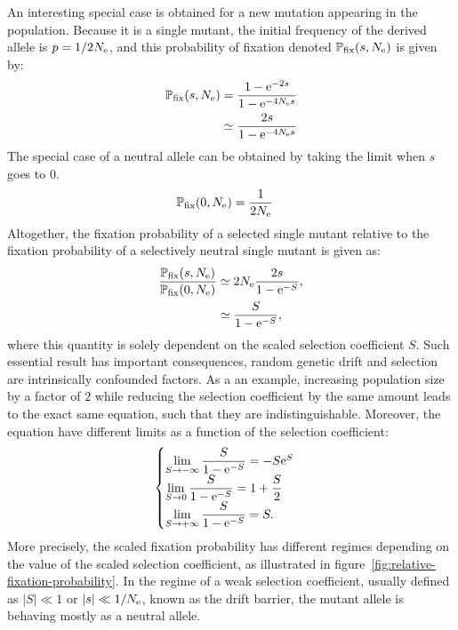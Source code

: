 An interesting special case is obtained for a new mutation appearing in the population.
Because it is a single mutant, the initial frequency of the derived allele is $p = 1 / 2 N_{\text{e}}$, and this probability of fixation denoted $\mathbb{P}_{\text{fix}}(s, N_{\text{e}})$ is given by:
\begin{align}
    \mathbb{P}_{\text{fix}}(s, N_{\text{e}}) & = \dfrac{1 - \text{e}^{-2 s}}{1 - \text{e}^{-4 N_{\text{e}} s}} \\
    & \simeq  \dfrac{2 s }{1 - \text{e}^{-4 N_{\text{e}} s}}
\end{align}
The special case of a neutral allele can be obtained by taking the limit when $s$ goes to $0$.
\begin{align}
    \mathbb{P}_{\text{fix}}(0, N_{\text{e}}) & = \dfrac{1}{2 N_{\text{e}}}
\end{align}
Altogether, the fixation probability of a selected single mutant relative to the fixation probability of a selectively neutral single mutant is given as:
\begin{align}
    \dfrac{\mathbb{P}_{\text{fix}}(s, N_{\text{e}})}{\mathbb{P}_{\text{fix}}(0, N_{\text{e}})} & \simeq 2 N_{\text{e}} \dfrac{2s}{1 - \text{e}^{-S}}, \\
    & \simeq  \dfrac{S}{1 - \text{e}^{-S}}, \label{eq:p-fix}
\end{align}
where this quantity is solely dependent on the scaled selection coefficient $S$.
Such essential result has important consequences, random genetic drift and selection are intrinsically confounded factors.
As a an example, increasing population size by a factor of $2$ while reducing the selection coefficient by the same amount leads to the exact same equation, such that they are indistinguishable.
Moreover, the equation have different limits as a function of the selection coefficient:
\begin{gather}
    \begin{cases}
        \lim\limits_{S \to -\infty} \dfrac{S}{1 - \text{e}^{-S}} = -S\text{e}^{S} \\
        \lim\limits_{S \to 0} \dfrac{S}{1 - \text{e}^{-S}} = 1 + \dfrac{S}{2}\\
        \lim\limits_{S \to + \infty} \dfrac{S}{1 - \text{e}^{-S}} = S.
    \end{cases} \label{eq:limits-proba-fix}
\end{gather}
More precisely, the scaled fixation probability has different regimes depending on the value of the scaled selection coefficient, as illustrated in figure~\ref{fig:relative-fixation-probability}.
In the regime of a weak selection coefficient, usually defined as $|S| \ll 1$ or $|s| \ll 1 / N_{\text{e}}$, known as the drift barrier, the mutant allele is behaving mostly as a neutral allele.

